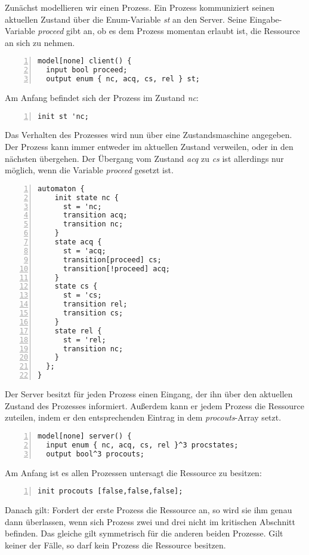 Zunächst modellieren wir einen Prozess.
Ein Prozess kommuniziert seinen aktuellen Zustand über die Enum-Variable \emph{st} an den Server.
Seine Eingabe-Variable \emph{proceed} gibt an, ob es dem Prozess momentan erlaubt ist, die Ressource an sich zu nehmen.
\begin{lstlisting}[language=gtl,numbers=left,caption={Mutex Client}]
model[none] client() {
  input bool proceed;
  output enum { nc, acq, cs, rel } st;
\end{lstlisting}
Am Anfang befindet sich der Prozess im Zustand \emph{nc}:
\begin{lstlisting}[language=gtl,numbers=left,firstnumber=last]
  init st 'nc;
\end{lstlisting}
Das Verhalten des Prozesses wird nun über eine Zustandsmaschine angegeben.
Der Prozess kann immer entweder im aktuellen Zustand verweilen, oder in den nächsten übergehen.
Der Übergang vom Zustand \emph{acq} zu \emph{cs} ist allerdings nur möglich, wenn die Variable \emph{proceed} gesetzt ist.
\begin{lstlisting}[language=gtl,numbers=left,firstnumber=last]
  automaton {
    init state nc {
      st = 'nc;
      transition acq;
      transition nc;
    }
    state acq {
      st = 'acq;
      transition[proceed] cs;
      transition[!proceed] acq;
    }
    state cs {
      st = 'cs;
      transition rel;
      transition cs;
    }
    state rel {
      st = 'rel;
      transition nc;
    }
  };
}
\end{lstlisting}
Der Server besitzt für jeden Prozess einen Eingang, der ihn über den aktuellen Zustand des Prozesses informiert.
Außerdem kann er jedem Prozess die Ressource zuteilen, indem er den entsprechenden Eintrag in dem \emph{procouts}-Array setzt.
\begin{lstlisting}[language=gtl,numbers=left,firstnumber=last,caption={Mutex Server}]
model[none] server() {
  input enum { nc, acq, cs, rel }^3 procstates;
  output bool^3 procouts;
\end{lstlisting}
Am Anfang ist es allen Prozessen untersagt die Ressource zu besitzen:
\begin{lstlisting}[language=gtl,numbers=left,firstnumber=last]
  init procouts [false,false,false];
\end{lstlisting}
Danach gilt: Fordert der erste Prozess die Ressource an, so wird sie ihm genau dann überlassen, wenn sich Prozess zwei und drei nicht im kritischen Abschnitt befinden.
Das gleiche gilt symmetrisch für die anderen beiden Prozesse.
Gilt keiner der Fälle, so darf kein Prozess die Ressource besitzen.
